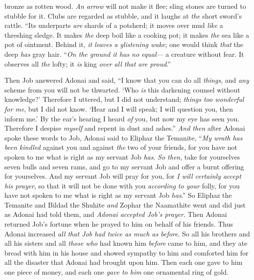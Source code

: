 \begin{biblechapter}
bronze as rotten wood.
\verse \textit{An arrow} will not make it flee; 
sling stones are turned to stubble for it.
\verse Clubs are regarded as stubble, 
and it laughs at \textit{the} short sword’s rattle.
\verse “Its underparts \textit{are} shards of a potsherd; 
it moves over mud \textit{like} a threshing sledge.
\verse It makes \textit{the} deep boil like a cooking pot; 
it makes \textit{the} sea like a pot of ointment.
\verse Behind it, \textit{it leaves a glistening wake}; 
one would think \textit{that} the deep \textit{has} gray hair.
\verse “\textit{On the ground it has no equal}— 
a creature without fear.
\verse It observes all \textit{the} lofty; 
it \textit{is} king \textit{over all that are proud}.”
\end{biblechapter}

\begin{biblechapter} %
 Then Job answered Adonai and said,
\verse “I know that you can do all \textit{things}, 
and \textit{any} scheme from you will not be thwarted.
\verse ‘Who \textit{is} this darkening counsel without knowledge?’ 
Therefore I uttered, but I did not understand; 
\textit{things too wonderful for me}, but I did not know.
\verse ‘Hear and I will speak; 
I will question you, then inform me.’
\verse By the ear’s hearing I heard \textit{of} you, 
but now my eye has seen you.
\verse Therefore I despise \textit{myself} 
and repent in dust and ashes.”
\verse \textit{And then} after Adonai spoke these words to Job, Adonai said to Eliphaz the Temanite, “\textit{My wrath has been kindled} against you and against \textit{the} two of your friends, for you have not spoken to me what is right as my servant Job \textit{has}.
\verse \textit{So then}, take for yourselves seven bulls and seven rams, and go to my servant Job and offer a burnt offering for yourselves. And my servant Job will pray for you, for \textit{I will certainly accept his prayer}, so that it will not be done with you \textit{according to your} folly, for you have not spoken to me what is right as my servant Job \textit{has}.”
\verse So Eliphaz the Temanite and Bildad the Shuhite \textit{and} Zophar the Naamathite went and did just as Adonai had told them, and \textit{Adonai accepted Job’s prayer}.
\verse Then Adonai returned Job’s fortune when he prayed to him on behalf of his friends. Thus Adonai increased \textit{all that Job had twice as much as before}.
\verse So all his brothers and all his sisters and all \textit{those who} had known him \textit{before} came to him, and they ate bread with him in his house and showed sympathy to him and comforted him for all the disaster that Adonai had brought upon him. Then each one gave to him one piece of money, and each one \textit{gave to him} one ornamental ring of gold.

\end{biblechapter}
